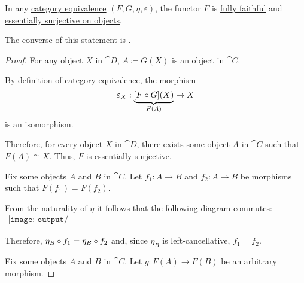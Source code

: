 \begin{proposition}\label{thm:equivalence_induces_fully_faithful_and_essentially_surjective_functor}
  In any \hyperref[def:category_equivalence]{category equivalence} \( (F, G, \eta, \varepsilon) \), the functor \( F \) is \hyperref[def:functor_invertibility/fully_faithful]{fully faithful} and \hyperref[def:functor_invertibility/surjective_on_objects]{essentially surjective on objects}.

  The converse of this statement is .
\end{proposition}
\begin{proof}
   For any object \( X \) in \( \cat{D} \), \( A \coloneqq G(X) \) is an object in \( \cat{C} \).

  By definition of category equivalence, the morphism
  \begin{equation*}
    \varepsilon_X: \underbrace{[F \bincirc G](X)}_{F(A)} \to X
  \end{equation*}
  is an isomorphism.

  Therefore, for every object \( X \) in \( \cat{D} \), there exists some object \( A \) in \( \cat{C} \) such that \( F(A) \cong X \). Thus, \( F \) is essentially surjective.

   Fix some objects \( A \) and \( B \) in \( \cat{C} \). Let \( f_1: A \to B \) and \( f_2: A \to B \) be morphisms such that \( F(f_1) = F(f_2) \).

  From the naturality of \( \eta \) it follows that the following diagram commutes:
  \begin{equation}\label{eq:thm:equivalence_induces_fully_faithful_and_essentially_surjective_functor/faithfullness}
    \begin{aligned}
      \texttt{[image: output/thm\_\_equivalence\_induces\_fully\_faithful\_and\_essentially\_surjective\_functor.pdf]}
    \end{aligned}
  \end{equation}

  Therefore, \( \eta_B \bincirc f_1 = \eta_B \bincirc f_2 \) and, since \( \eta_B \) is left-cancellative, \( f_1 = f_2 \).

   Fix some objects \( A \) and \( B \) in \( \cat{C} \). Let \( g: F(A) \to F(B) \) be an arbitrary morphism.


\end{proof}
